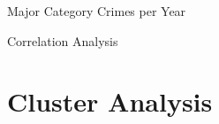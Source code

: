 \documentclass[12pt]{beamer}
\begin{document}
        \begin{frame}{Major Category Crimes per Year}
            \begin{figure}
                \centering
            \end{figure}
        \end{frame}

        \begin{frame}{Correlation Analysis}
            \begin{figure}
                \centering
            \end{figure}
        \end{frame}

    \section{Cluster Analysis} %
    \label{sec:cluster_analysis}

\end{document}
